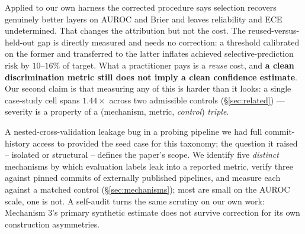 \documentclass{article}
\begin{document}
Applied to our own harness the corrected procedure says selection recovers
genuinely better layers on AUROC and Brier and leaves reliability and ECE
undetermined. That changes the attribution but not the cost. The
reused-versus-held-out gap is directly measured and needs no correction: a
threshold calibrated on the former and transferred to the latter inflates
achieved selective-prediction risk by $10$--$16\%$ of target. What a
practitioner pays is a \emph{reuse} cost, and \textbf{a clean discrimination
metric still does not imply a clean confidence estimate}. Our second claim is
that measuring any of this is harder than it looks: a single case-study cell
spans $1.44\times$ across two admissible controls (\S\ref{sec:related}) ---
severity is a property of a (mechanism, metric, \emph{control}) \emph{triple}.

A nested-cross-validation leakage bug in a probing pipeline we had full
commit-history access to provided the seed case for this taxonomy; the
question it raised -- isolated or structural -- defines the paper's scope. We identify five \emph{distinct} mechanisms by
which evaluation labels leak into a reported metric, verify three against
pinned commits of externally published pipelines, and measure each against a
matched control (\S\ref{sec:mechanisms}); most are small on the AUROC scale,
one is not. A self-audit turns the same scrutiny on our own work: Mechanism 3's
primary synthetic estimate does not survive correction for its own
construction asymmetries.
\end{document}
